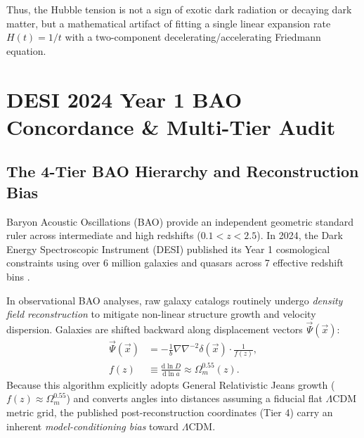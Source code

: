 \documentclass[aps,prd,reprint,superscriptaddress,nofootinbib,floatfix,amsmath,amssymb]{revtex4-2}
\begin{document}
Thus, the Hubble tension is not a sign of exotic dark radiation or decaying dark matter, but a mathematical artifact of fitting a single linear expansion rate $H(t) = 1/t$ with a two-component decelerating/accelerating Friedmann equation.

\section{DESI 2024 Year 1 BAO Concordance \& Multi-Tier Audit}
\label{sec:desi_bao}

\subsection{The 4-Tier BAO Hierarchy and Reconstruction Bias}

Baryon Acoustic Oscillations (BAO) provide an independent geometric standard ruler across intermediate and high redshifts ($0.1 < z < 2.5$). In 2024, the Dark Energy Spectroscopic Instrument (DESI) published its Year 1 cosmological constraints using over 6 million galaxies and quasars across 7 effective redshift bins \cite{DESI2024_BAO}.

In observational BAO analyses, raw galaxy catalogs routinely undergo \textit{density field reconstruction} \cite{Eisenstein2007} to mitigate non-linear structure growth and velocity dispersion. Galaxies are shifted backward along displacement vectors $\vec{\Psi}(\vec{x})$:
\begin{align}
\vec{\Psi}(\vec{x}) &= -\frac{1}{b} \nabla \nabla^{-2} \delta(\vec{x}) \cdot \frac{1}{f(z)}, \label{eq:reconstruction_displacement} \\
f(z) &\equiv \frac{\mathrm{d}\ln D}{\mathrm{d}\ln a} \approx \Omega_m^{0.55}(z). \nonumber
\end{align}
Because this algorithm explicitly adopts General Relativistic Jeans growth ($f(z) \approx \Omega_m^{0.55}$) and converts angles into distances assuming a fiducial flat $\Lambda\text{CDM}$ metric grid, the published post-reconstruction coordinates (Tier 4) carry an inherent \textit{model-conditioning bias} toward $\Lambda\text{CDM}$.
\end{document}
